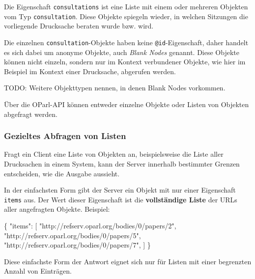 \documentclass[,a4paper]{article}
\newenvironment{Shaded}{}{}
\newcommand{\DataTypeTok}[1]{\textcolor[rgb]{0.56,0.13,0.00}{{#1}}}
\newcommand{\StringTok}[1]{\textcolor[rgb]{0.25,0.44,0.63}{{#1}}}
\newcommand{\NormalTok}[1]{{#1}}
\begin{document}
Die Eigenschaft \texttt{consultations} ist eine Liste mit einem oder
mehreren Objekten vom Typ \texttt{consultation}. Diese Objekte spiegeln
wieder, in welchen Sitzungen die vorliegende Drucksache beraten wurde
bzw. wird.

Die einzelnen \texttt{consultation}-Objekte haben keine
\texttt{@id}-Eigenschaft, daher handelt es sich dabei um anonyme
Objekte, auch \emph{Blank Nodes} genannt. Diese Objekte können nicht
einzeln, sondern nur im Kontext verbundener Objekte, wie hier im
Beispiel im Kontext einer Drucksache, abgerufen werden.

TODO: Weitere Objekttypen nennen, in denen Blank Nodes vorkommen.


Über die OParl-API können entweder einzelne Objekte oder Listen von
Objekten abgefragt werden.

\subsubsection{Gezieltes Abfragen von
Listen}\label{gezieltes-abfragen-von-listen}

Fragt ein Client eine Liste von Objekten an, beispielsweise die Liste
aller Drucksachen in einem System, kann der Server innerhalb bestimmter
Grenzen entscheiden, wie die Ausgabe aussieht.

In der einfachsten Form gibt der Server ein Objekt mit nur einer
Eigenschaft \texttt{items} aus. Der Wert dieser Eigenschaft ist die
\textbf{vollständige Liste} der URLs aller angefragten Objekte.
Beispiel:

\begin{Shaded}
\begin{Highlighting}[]
\NormalTok{\{}
    \DataTypeTok{"items"}\NormalTok{: [}
        \StringTok{"http://refserv.oparl.org/bodies/0/papers/2"}\NormalTok{,}
        \StringTok{"http://refserv.oparl.org/bodies/0/papers/5"}\NormalTok{,}
        \StringTok{"http://refserv.oparl.org/bodies/0/papers/7"}\NormalTok{,}
    \NormalTok{]}
\NormalTok{\}}
\end{Highlighting}
\end{Shaded}

Diese einfachste Form der Antwort eignet sich nur für Listen mit einer
begrenzten Anzahl von Einträgen.
\end{document}
